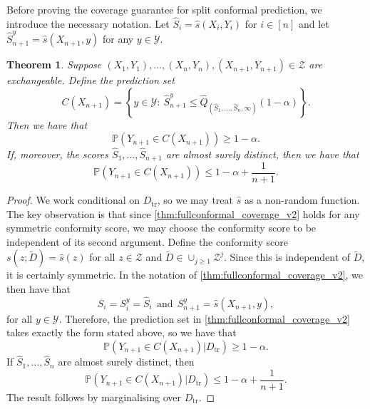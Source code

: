 \documentclass[11pt, titlepage]{article} %
\newcommand{\Prob}[1]{\mathbb{P}\left( #1 \right)}
\numberwithin{equation}{section}
\newtheorem{theorem}{Theorem}
\theoremstyle{definition}
\numberwithin{theorem}{section}
\numberwithin{lemma}{section}
\numberwithin{corollary}{section}
\numberwithin{proposition}{section}
\numberwithin{definition}{section}
\numberwithin{remark}{section}
\begin{document}
\noindent
Before proving the coverage guarantee for split conformal prediction, we introduce the necessary notation. Let \(\hat{S}_i = \hat{s}(X_i, Y_i)\) for \(i \in [n]\) and let \(\hat{S}_{n+1}^y = \hat{s}(X_{n+1}, y)\) for any \(y \in \mathcal{Y}\).

\begin{theorem}
    Suppose \((X_1, Y_1), \ldots, (X_n, Y_n), (X_{n+1}, Y_{n+1}) \in \mathcal{Z}\) are exchangeable. Define the prediction set \begin{equation}
        C(X_{n+1}) = \left\{ y \in \mathcal{Y}: \  \hat{S}_{n+1}^y \leq \hat{Q}_{(\hat{S}_1, \ldots, \hat{S}_n, \infty)}(1-\alpha)  \right\}.
    \label{eqn:splitconformal_prediction_set}
    \end{equation} Then we have that \[\Prob{Y_{n+1} \in C(X_{n+1})} \geq 1-\alpha.\] If, moreover, the scores \(\hat{S}_1, \ldots, \hat{S}_{n+1}\) are almost surely distinct, then we have that \[\Prob{Y_{n+1} \in C(X_{n+1})} \leq 1-\alpha + \frac{1}{n+1}.\]
\label{thm:splitconformal_coverage}
\end{theorem}
\begin{proof}
    We work conditional on \(D_\mathrm{tr}\), so we may treat \(\hat{s}\) as a non-random function. The key observation is that since \cref{thm:fullconformal_coverage_v2} holds for any symmetric conformity score, we may choose the conformity score to be independent of its second argument. Define the conformity score \(s(z; \tilde{D}) = \hat{s}(z)\) for all \(z \in \mathcal{Z}\) and \(\tilde{D} \in \cup_{j \geq 1} \mathcal{Z}^j\). Since this is independent of \(\tilde{D}\), it is certainly symmetric. In the notation of \cref{thm:fullconformal_coverage_v2}, we then have that \[S_i = S_i^y = \hat{S}_i \ \ \mathrm{and} \ \ S_{n+1}^y = \hat{s}(X_{n+1}, y),\] for all \(y \in \mathcal{Y}\). Therefore, the prediction set in \cref{thm:fullconformal_coverage_v2} takes exactly the form stated above, so we have that \[\Prob{Y_{n+1} \in C(X_{n+1}) | D_{\mathrm{tr}}  } \geq 1-\alpha.\] If \(\hat{S}_1, \ldots, \hat{S}_n\) are almost surely distinct, then \[\Prob{Y_{n+1} \in C(X_{n+1}) | D_{\mathrm{tr}}  } \leq 1-\alpha + \frac{1}{n+1}.\] The result follows by marginalising over \(D_\mathrm{tr}.\)
\end{proof}
\end{document}
